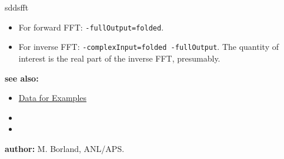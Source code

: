 \begin{sddsprog}{sddsfft}
\begin{itemize}
      \item For forward FFT: \verb|-fullOutput=folded|.
      \item For inverse FFT: \verb|-complexInput=folded -fullOutput|. The quantity of interest is the real part of the inverse FFT, presumably.
    \end{itemize}
  \item \textbf{see also:}
    \begin{itemize}
      \item \hyperref[exampleData]{Data for Examples}
      \item {}
      \item {}
    \end{itemize}
  \item \textbf{author:} M. Borland, ANL/APS.
\end{sddsprog}
